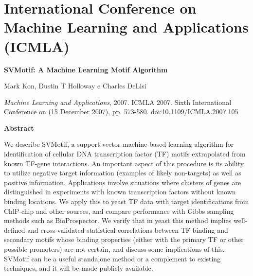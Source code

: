 \chapter{International Conference on Machine Learning and Applications (ICMLA)}

{\Large \bf SVMotif: A Machine Learning Motif Algorithm}

Mark Kon, Dustin T Holloway e Charles DeLisi

{\it Machine Learning and Applications}, 2007. ICMLA 2007. Sixth International Conference on (15 December 2007), pp. 573-580. doi:10.1109/ICMLA.2007.105

{\large \bf Abstract}

We describe SVMotif, a support vector machine-based learning algorithm for identification of cellular DNA transcription factor (TF) motifs extrapolated from known TF-gene interactions. An important aspect of this procedure is its ability to utilize negative target information (examples of likely non-targets) as well as positive information. Applications involve situations where clusters of genes are distinguished in experiments with known transcription factors without known binding locations. We apply this to yeast TF data with target identifications from ChlP-chip and other sources, and compare performance with Gibbs sampling methods such as BioProspector. We verify that in yeast this method implies well-defined and cross-validated statistical correlations between TF binding and secondary motifs whose binding properties (either with the primary TF or other possible promoters) are not certain, and discuss some implications of this. SVMotif can be a useful standalone method or a complement to existing techniques, and it will be made publicly available.
